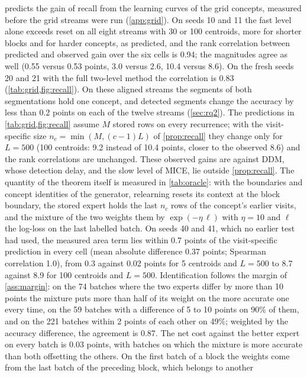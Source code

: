 \documentclass[11pt]{article}
\theoremstyle{plain}
\theoremstyle{definition}
\theoremstyle{remark}
\newcommand{\method}{\textsc{MICE}}   %
\begin{document}
 predicts the gain of recall from the learning curves of the grid concepts, measured before the
grid streams were run (\cref{app:grid}). On seeds 10 and 11 the fast level alone exceeds reset on all eight streams with 30 or 100
centroids, more for shorter blocks and for harder concepts, as predicted, and the rank correlation between predicted
and observed gain over the six cells is 0.94; the magnitudes agree as well (0.55 versus 0.53 points, 3.0 versus 2.6,
10.4 versus 8.6). On the fresh seeds 20 and 21 with the full two-level method the correlation is 0.83
(\cref{tab:grid,fig:recall}). On these aligned streams the segments of both segmentations hold one concept, and
detected segments change the accuracy by less than 0.2 points on each of the twelve streams (\cref{sec:rq2}). The predictions in \cref{tab:grid,fig:recall}
assume $M$ stored rows on every recurrence; with the visit-specific size $n_c=\min(M,(c-1)L)$ of \cref{prop:recall}
they change only for $L=500$ (100 centroids: 9.2 instead of 10.4 points, closer to the observed 8.6) and the rank
correlations are unchanged. These observed gains are against DDM, whose detection delay, and the slow level of \method{}, lie outside
\cref{prop:recall}. The quantity of the theorem itself is measured in \cref{tab:oracle}: with the boundaries and
concept identities of the generator, relearning resets its context at the block boundary, the stored expert holds
the last $n_c$ rows of the concept's earlier visits, and the mixture of the two weights them by
$\exp(-\eta\,\ell)$ with $\eta=10$ and $\ell$ the log-loss on the last labelled batch. On seeds 40 and 41, which no earlier test had used,
the measured area term lies within 0.7 points of the visit-specific prediction in every cell (mean absolute
difference 0.37 points; Spearman correlation 1.0), from 0.3 against 0.02 points for 5 centroids and $L=500$ to 8.7
against 8.9 for 100 centroids and $L=500$. Identification follows the margin of \cref{ass:margin}: on the 74 batches where the two experts
differ by more than 10 points the mixture puts more than half of its weight on the more accurate one every time, on
the 59 batches with a difference of 5 to 10 points on 90\% of them, and on the 221 batches within 2 points of each
other on 49\%; weighted by the accuracy difference, the agreement is 0.87. The net cost against the better expert on
every batch is 0.03 points, with batches on which the mixture is more accurate than both offsetting the others. On
the first batch of a block the weights come from the last batch of the preceding block, which belongs to another
\end{document}
